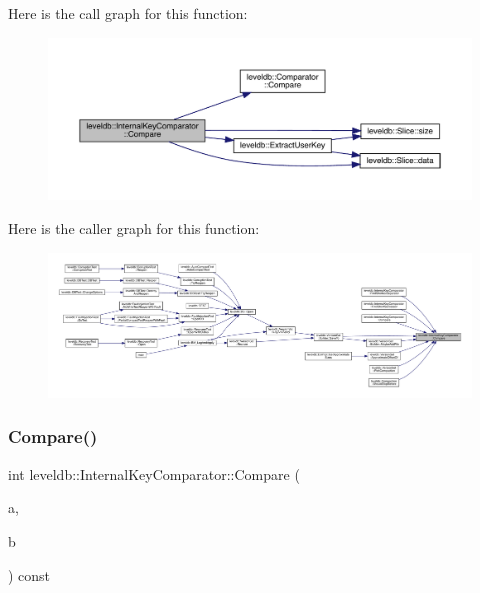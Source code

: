 Here is the call graph for this function\+:
\nopagebreak
\begin{figure}[H]
\begin{center}
\leavevmode
\includegraphics[width=350pt]{classleveldb_1_1_internal_key_comparator_a8ee088d285165f692f2f03ac5b3e13b1_cgraph}
\end{center}
\end{figure}
Here is the caller graph for this function\+:
\nopagebreak
\begin{figure}[H]
\begin{center}
\leavevmode
\includegraphics[width=350pt]{classleveldb_1_1_internal_key_comparator_a8ee088d285165f692f2f03ac5b3e13b1_icgraph}
\end{center}
\end{figure}
\mbox{\label{classleveldb_1_1_internal_key_comparator_a715d8e2eb246df39248ce54789fb4621}} 
\subsubsection{\texorpdfstring{Compare()}{Compare()}\hspace{0.1cm}{\footnotesize\ttfamily [2/2]}}
{\footnotesize\ttfamily int leveldb\+::\+Internal\+Key\+Comparator\+::\+Compare (\begin{DoxyParamCaption}\item[{const \mbox{\hyperlink{classleveldb_1_1_internal_key}{Internal\+Key}} \&}]{a,  }\item[{const \mbox{\hyperlink{classleveldb_1_1_internal_key}{Internal\+Key}} \&}]{b }\end{DoxyParamCaption}) const\hspace{0.3cm}{\ttfamily [inline]}}

